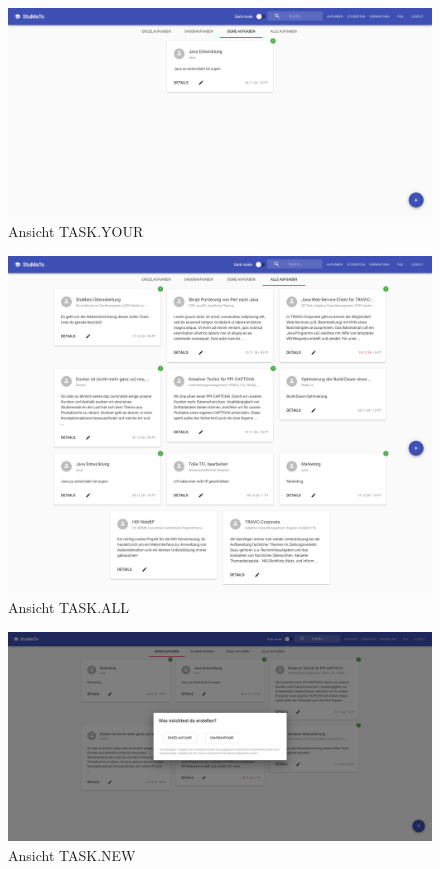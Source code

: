 \documentclass[
  12pt,
  ngerman,
  a4paper,
]{article}
\begin{document}
\begin{figure}
\centering
\includegraphics{./tex2pdf.-930e6666e1221838/108f3c537d8035b8bdc8a1058ba8f82610771530.png}
\caption{Ansicht TASK.YOUR}
\end{figure}

\begin{figure}
\centering
\includegraphics{./tex2pdf.-930e6666e1221838/da9ee686dc2d8ad97ac31e5253caf99016a4e3f5.png}
\caption{Ansicht TASK.ALL}
\end{figure}

\begin{figure}
\centering
\includegraphics{./tex2pdf.-930e6666e1221838/303dcfe459fd3b8446fc3094f7aa678a2a72eef0.png}
\caption{Ansicht TASK.NEW}
\end{figure}
\end{document}
